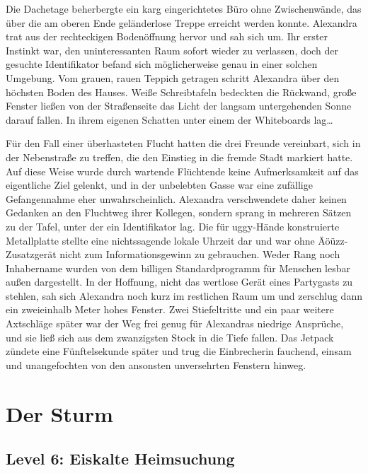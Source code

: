 Die Dachetage beherbergte ein karg eingerichtetes Büro ohne Zwischenwände, das über die am oberen Ende geländerlose Treppe erreicht werden konnte. Alexandra trat aus der rechteckigen Bodenöffnung hervor und sah sich um. Ihr erster Instinkt war, den uninteressanten Raum sofort wieder zu verlassen, doch der gesuchte Identifikator befand sich möglicherweise genau in einer solchen Umgebung. Vom grauen, rauen Teppich getragen schritt Alexandra über den höchsten Boden des Hauses. Weiße Schreibtafeln bedeckten die Rückwand, große Fenster ließen von der Straßenseite das Licht der langsam untergehenden Sonne darauf fallen. In ihrem eigenen Schatten unter einem der Whiteboards lag…


Für den Fall einer überhasteten Flucht hatten die drei Freunde vereinbart, sich in der Nebenstraße zu treffen, die den Einstieg in die fremde Stadt markiert hatte. Auf diese Weise wurde durch wartende Flüchtende keine Aufmerksamkeit auf das eigentliche Ziel gelenkt, und in der unbelebten Gasse war eine zufällige Gefangennahme eher unwahrscheinlich. Alexandra verschwendete daher keinen Gedanken an den Fluchtweg ihrer Kollegen, sondern sprang in mehreren Sätzen zu der Tafel, unter der ein Identifikator lag. Die für uggy-Hände konstruierte Metallplatte stellte eine nichtssagende lokale Uhrzeit dar und war ohne Äöüzz-Zusatzgerät nicht zum Informationsgewinn zu gebrauchen. Weder Rang noch Inhabername wurden von dem billigen Standardprogramm für Menschen lesbar außen dargestellt. In der Hoffnung, nicht das wertlose Gerät eines Partygasts zu stehlen, sah sich Alexandra noch kurz im restlichen Raum um und zerschlug dann ein zweieinhalb Meter hohes Fenster. Zwei Stiefeltritte und ein paar weitere Axtschläge später war der Weg frei genug für Alexandras niedrige Ansprüche, und sie ließ sich aus dem zwanzigsten Stock in die Tiefe fallen. Das Jetpack zündete eine Fünftelsekunde später und trug die Einbrecherin fauchend, einsam und unangefochten von den ansonsten unversehrten Fenstern hinweg.


\chapter{Der Sturm}

\section{Level 6: Eiskalte Heimsuchung}

